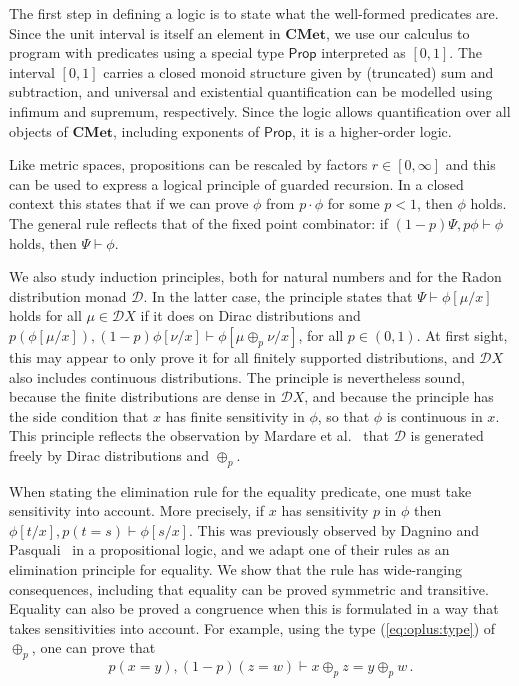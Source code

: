 \documentclass[a4paper,UKenglish,cleveref, autoref, thm-restate]{lipics-v2021}
\newcommand{\cat}[1]{\mathbf{#1}}
\newcommand{\CMet}{\cat{CMet}}
\newcommand{\extpreals}{[0,\infty]}
\newcommand{\uinterval}{[0,1]}
\newcommand{\D}{\mathcal{D}}
\newcommand{\ts}{\vdash}
\newcommand{\Prop}{\mathsf{Prop}}
\newcommand{\TD}{\mathcal{D}}
\newcommand{\peq}{=}
\begin{document}
The first step in defining a logic is to state what the well-formed predicates are. Since the 
unit interval is itself an element in $\CMet$, we use our calculus to program with 
predicates using a special type $\Prop$ interpreted as $\uinterval$. The interval $\uinterval$
carries a closed monoid structure given by (truncated) sum and subtraction,
and universal and existential quantification can be modelled using infimum and supremum, respectively.
Since the logic allows quantification over all objects of $\CMet$, including 
exponents of $\Prop$, it is a higher-order logic. 

Like metric spaces, propositions can be rescaled by factors $r \in \extpreals$ and this 
can be used to express a logical principle of guarded recursion.
In a closed context this states that if we can 
prove $\phi$ from $p\cdot \phi$ for some $p<1$, then $\phi$ holds. 
The general rule reflects that of the fixed point combinator:
if $(1-p)\Psi, p\phi\ts \phi$ holds, then  $\Psi \ts \phi$.

We also study induction principles, both for natural numbers and for the Radon distribution monad $\TD$.
In the latter case, the principle states that $\Psi \vdash \phi[\mu/x]$ holds for all 
$\mu \in \TD X$ if it does on  
Dirac distributions and 
$p(\phi[\mu/x]), (1-p)\phi[\nu/x] \ts \phi[\mu \oplus_p \nu/x]$, for all $p \in (0,1)$.
At first sight, this may appear to only prove it for all finitely supported distributions, and $\TD X$ also includes continuous distributions.
The principle is nevertheless sound, because the finite distributions are dense in $\D X$, and because the principle has the side condition
that $x$ has finite sensitivity in $\phi$, so that $\phi$ is continuous in $x$. This principle reflects
the observation by Mardare et al.~\cite{MardarePP16,MardarePP18} 
that $\TD$ is generated freely by Dirac distributions and $\oplus_p$.

When stating the elimination rule for the 
equality predicate, one must take sensitivity into account. More precisely, if $x$ has sensitivity $p$ in $\phi$
then $\phi[t/x], p(t \peq s ) \ts \phi[s/x]$. 
This was previously observed by Dagnino and Pasquali~\cite{DagninoP22} in a propositional logic, and we adapt one of their rules as
an elimination principle for equality. We show that the rule
has wide-ranging consequences, including that equality can be proved symmetric and transitive. Equality
can also be proved a congruence when this is formulated in a way that takes sensitivities into account. 
For example, using the type (\ref{eq:oplus:type}) of $\oplus_p$, one can prove that 
\begin{equation} \label{eq:oplus:congruence}
p(x \peq y), (1-p)(z\peq w) \ts x \oplus_p z \peq y \oplus_p w \, .
\end{equation}
\end{document}
